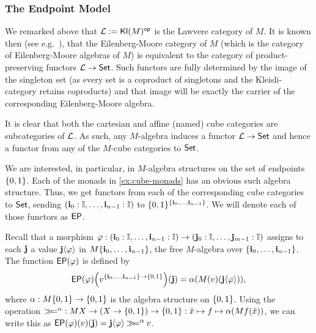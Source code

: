 \documentclass[a4paper]{article}
\begin{document}
\subsubsection{The Endpoint Model}
We remarked above that ${\mathcal L} := {\mathsf{Kl}}(M)^{\mathsf{op}}$ is the Lawvere category of $M$.
It is known then (see e.g.\ \cite{keml-diagrams}), that the Eilenberg-Moore category of $M$ (which is the category of Eilenberg-Moore algebras of $M$) is equivalent to the category of product-preserving functors ${\mathcal L} \to {\mathsf{Set}}$.
Such functors are fully determined by the image of the singleton set (as every set is a coproduct of singletons and the Kleisli-category retains coproducts) and that image will be exactly the carrier of the corresponding Eilenberg-Moore algebra.

It is clear that both the cartesian and affine (named) cube categories are subcategories of ${\mathcal L}$.
As such, any $M$-algebra induces a functor ${\mathcal L} \to {\mathsf{Set}}$ and hence a functor from any of the $M$-cube categories to ${\mathsf{Set}}$.

We are interested, in particular, in $M$-algebra structures on the set of endpoints $\mathopen{}\left\{ 0, 1 \right\}\mathclose{}$.
Each of the monads in \cref{ex:cube-monads} has an obvious such algebra structure.
Thus, we get functors from each of the corresponding cube categories to ${\mathsf{Set}}$,
sending $(\mathbf{i}_0 : {\mathbb I}, \ldots, \mathbf{i}_{n-1} : {\mathbb I})$ to $\mathopen{}\left\{ 0, 1 \right\}\mathclose{}^{\mathopen{}\left\{ \mathbf{i}_0, \ldots, \mathbf{i}_{n-1} \right\}\mathclose{}}$.
We will denote each of those functors as $\mathsf{EP}$.

Recall that a morphism $\varphi : (\mathbf{i}_0 : {\mathbb I}, \ldots, \mathbf{i}_{n-1} : {\mathbb I}) \to (\mathbf{j}_0 : {\mathbb I}, \ldots, \mathbf{j}_{m-1} : {\mathbb I})$ assigns to each $\mathbf{j}$ a value $\mathbf{j}\langle \varphi \rangle$ in $M \mathopen{}\left\{ \mathbf{i}_0, \ldots, \mathbf{i}_{n-1} \right\}\mathclose{}$, the free $M$-algebra over $\mathopen{}\left\{ \mathbf{i}_0, \ldots, \mathbf{i}_{n-1} \right\}\mathclose{}$.
The function $\mathsf{EP}(\varphi)$ is defined by
\[
	\mathsf{EP}(\varphi)
	\mathopen{}\left(  v^{\mathopen{}\left\{ \mathbf{i}_0, \ldots, \mathbf{i}_{n-1} \right\}\mathclose{} \to \mathopen{}\left\{ 0, 1 \right\}\mathclose{}}  \right)\mathclose{}
	(\mathbf{j})
	= \alpha\mathopen{}\left(  M(v)(\mathbf{j} \langle \varphi \rangle)  \right)\mathclose{},
\]
where $\alpha : M\mathopen{}\left\{ 0, 1 \right\}\mathclose{} \to \mathopen{}\left\{ 0, 1 \right\}\mathclose{}$ is the algebra structure on $\mathopen{}\left\{ 0, 1 \right\}\mathclose{}$.
Using the operation $\mathbin{\gg\hspace{-.5ex}=}^\alpha : MX \to (X \to \mathopen{}\left\{ 0, 1 \right\}\mathclose{}) \to \mathopen{}\left\{ 0, 1 \right\}\mathclose{} : \hat x \mapsto f \mapsto \alpha (Mf(\hat x))$, we can write this as $\mathsf{EP}(\varphi)(v)(\mathbf{j}) = \mathbf{j} \langle \varphi \rangle \mathbin{\gg\hspace{-.5ex}=}^\alpha v$.
\end{document}
